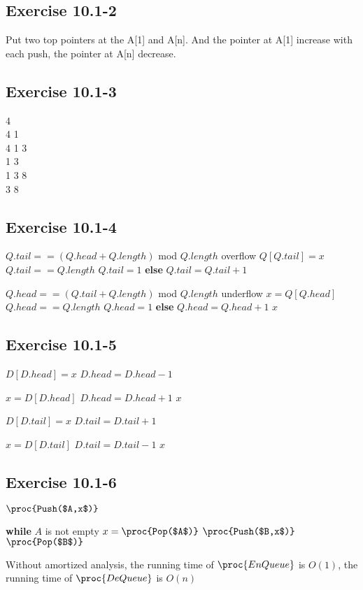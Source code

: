 \documentclass[12pt]{article}
\theoremstyle{definition}
\theoremstyle{remark}
\begin{document}
\subsection*{Exercise 10.1-2}
Put two top pointers at the A[1] and A[n]. And the pointer at A[1] increase with each push, the pointer at A[n] decrease.
\subsection*{Exercise 10.1-3}
4\\
4 1\\
4 1 3\\
1 3\\
1 3 8\\
3 8
\subsection*{Exercise 10.1-4}
\begin{codebox}
\li \If $Q.tail==(Q.head+Q.length)$ mod $Q.length$
\li \quad \Return overflow
\li $Q[Q.tail]=x$
\li \If $Q.tail==Q.length$
\li \quad $Q.tail=1$
\li \textbf{else} $Q.tail=Q.tail+1$
\end{codebox}
\begin{codebox}
\li \If $Q.head==(Q.tail+Q.length)$ mod $Q.length$
\li \quad \Return underflow
\li $x=Q[Q.head]$
\li \If $Q.head==Q.length$
\li \quad $Q.head=1$
\li \textbf{else} $Q.head=Q.head+1$
\li \Return $x$
\end{codebox}
\subsection*{Exercise 10.1-5}
\begin{codebox}
\li $D[D.head]=x$
\li $D.head=D.head-1$
\end{codebox}
\begin{codebox}
\li $x=D[D.head]$
\li $D.head=D.head+1$
\li \Return $x$
\end{codebox}
\begin{codebox}
\li $D[D.tail]=x$
\li $D.tail=D.tail+1$
\end{codebox}
\begin{codebox}
\li $x=D[D.tail]$
\li $D.tail=D.tail-1$
\li \Return $x$
\end{codebox}
\subsection*{Exercise 10.1-6}
\begin{codebox}
\li $\proc{Push($A,x$)}$
\end{codebox}
\begin{codebox}
\li \textbf{while} $A$ is not empty
\li \quad $x=\proc{Pop($A$)}$
\li \quad $\proc{Push($B,x$)}$
\li \Return $\proc{Pop($B$)}$
\end{codebox}
Without amortized analysis, the running time of $\proc{EnQueue}$ is $O(1)$, the running time of $\proc{DeQueue}$ is $O(n)$
\end{document}
